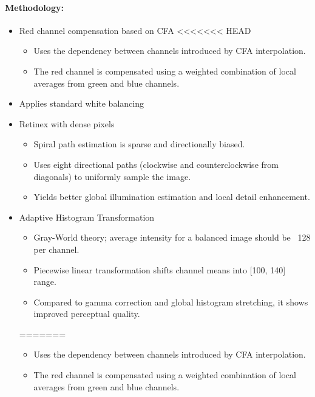 \documentclass{article}
\begin{document}
\paragraph{Methodology:}
\begin{itemize}
    \item Red channel compensation based on CFA
<<<<<<< HEAD
        \begin{itemize}
            \item Uses the dependency between channels introduced by CFA interpolation.
            \item The red channel is compensated using a weighted combination of local averages from green and blue channels.
        \end{itemize}

    \item Applies standard white balancing
    \item Retinex with dense pixels
        \begin{itemize}
            \item Spiral path estimation is sparse and directionally biased.
            \item Uses eight directional paths (clockwise and counterclockwise from diagonals) to uniformly sample the image.
            \item Yields better global illumination estimation and local detail enhancement.
        \end{itemize}
    \item Adaptive Histogram Transformation
        \begin{itemize}
            \item Gray-World theory; average intensity for a balanced image should be ~128 per channel.
            \item Piecewise linear transformation shifts channel means into [100, 140] range.
            \item Compared to gamma correction and global histogram stretching, it shows improved perceptual quality.
        \end{itemize}
=======
          \begin{itemize}
              \item Uses the dependency between channels introduced by CFA interpolation.
              \item The red channel is compensated using a weighted combination of local averages from green and blue channels.
          \end{itemize}


\end{itemize}
\end{document}
